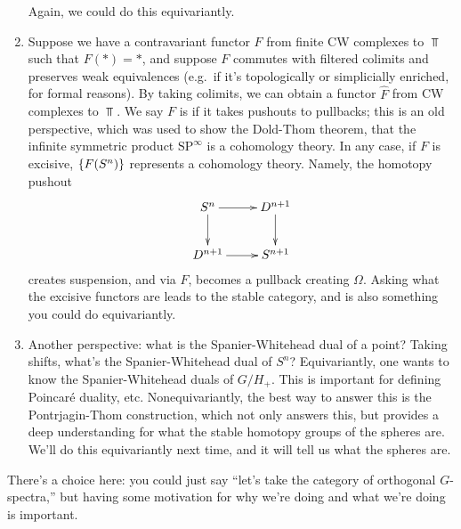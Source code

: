 \begin{enumerate}
	Again, we could do this equivariantly.
	\item Suppose we have a contravariant functor $F$ from finite CW complexes to $\Top$ such that $F(*) = *$, and
	suppose $F$ commutes with filtered colimits and preserves weak equivalences (e.g.\ if it's topologically or
	simplicially enriched, for formal reasons). By taking colimits, we can obtain a functor $\widehat F$ from CW
	complexes to $\Top$. We say $F$ is  if it takes pushouts to pullbacks; this is an old
	perspective, which was used to show the Dold-Thom theorem, that the infinite symmetric product
	$\mathrm{SP}^\infty$ is a cohomology theory. In any case, if $F$ is excisive, $\{F(S^n)\}$ represents a
	cohomology theory. Namely, the homotopy pushout
	\[\xymatrix{S^n\ar[r]\ar[d] & D^{n+1}\ar[d]\\
	D^{n+1}\ar[r] & S^{n+1}
	}\]
	creates suspension, and via $F$, becomes a pullback creating $\Omega$. Asking what the excisive functors are
	leads to the stable category, and is also something you could do equivariantly.
	\item Another perspective: what is the Spanier-Whitehead dual of a point? Taking shifts, what's the
	Spanier-Whitehead dual of $S^n$? Equivariantly, one wants to know the Spanier-Whitehead duals of $G/H_+$. This
	is important for defining Poincaré duality, etc. Nonequivariantly, the best way to answer this is the
	Pontrjagin-Thom construction, which not only answers this, but provides a deep understanding for what the
	stable homotopy groups of the spheres are. We'll do this equivariantly next time, and it will tell us what the
	spheres are.
\end{enumerate}
There's a choice here: you could just say ``let's take the category of orthogonal $G$-spectra,'' but having some
motivation for why we're doing and what we're doing is important.
